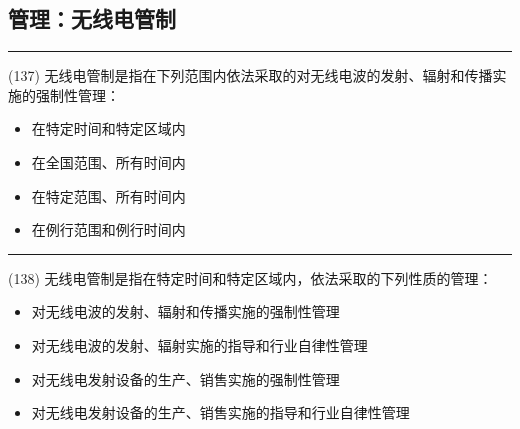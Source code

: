 \documentclass[twocolumn,hyperref,UTF8]{ctexart}  %
\begin{document}





\clearpage
\subsection{管理：无线电管制}


\noindent\rule{0.5\textwidth}{1pt}
\heiti (137) 无线电管制是指在下列范围内依法采取的对无线电波的发射、辐射和传播实施的强制性管理： \songti {\color{gray} [LK0105] }
\begin{itemize}
	\item  在特定时间和特定区域内
	\item  在全国范围、所有时间内
	\item  在特定范围、所有时间内
	\item  在例行范围和例行时间内
\end{itemize}


\noindent\rule{0.5\textwidth}{1pt}
\heiti (138) 无线电管制是指在特定时间和特定区域内，依法采取的下列性质的管理： \songti {\color{gray} [LK0106] }
\begin{itemize}
	\item  对无线电波的发射、辐射和传播实施的强制性管理
	\item  对无线电波的发射、辐射实施的指导和行业自律性管理
	\item  对无线电发射设备的生产、销售实施的强制性管理
	\item  对无线电发射设备的生产、销售实施的指导和行业自律性管理
\end{itemize}
\end{document}

